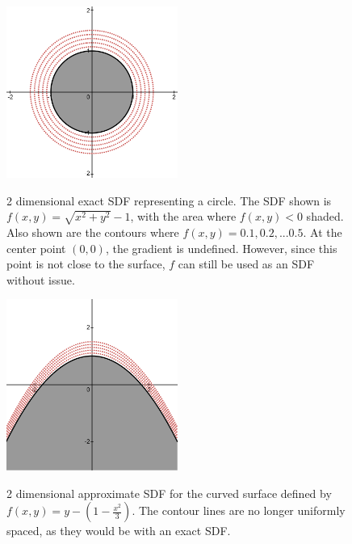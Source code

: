 \documentclass[11pt]{article}
\begin{document}
\begin{figure}
\caption{2 dimensional exact SDF representing a circle. The SDF shown is $f\left(x,y\right)=\sqrt{x^2+y^2}-1$, with the area where $f\left(x,y\right)<0$ shaded. Also shown are the contours where $f\left(x,y\right)=0.1,0.2,...0.5$. At the center point $\left(0,0\right)$, the gradient is undefined. However, since this point is not close to the surface, $f$ can still be used as an SDF without issue.}
\includegraphics[width=0.5\textwidth]{Circle_SDF}
\label{fig:Circle_SDF}
\end{figure}


\begin{figure}
\caption{2 dimensional approximate SDF for the curved surface defined by $f\left(x,y\right)=y-\left(1-\frac{x^2}{3}\right)$. The contour lines are no longer uniformly spaced, as they would be with an exact SDF.}
\includegraphics[width=0.5\textwidth]{Hill_SDF}
\label{fig:Hill_SDF}
\end{figure}
\end{document}
